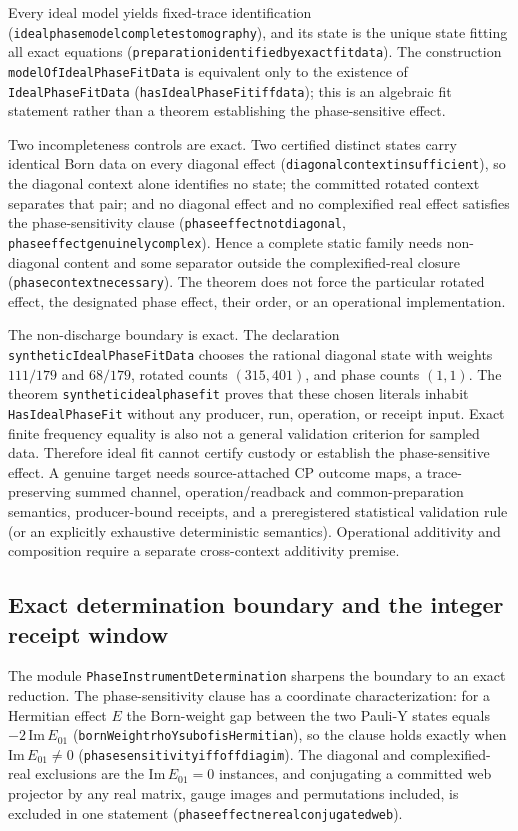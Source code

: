 \documentclass[11pt]{article}
\renewcommand{\_}{\textunderscore\allowbreak}
\theoremstyle{remark}
\begin{document}
Every ideal model yields fixed-trace identification
(\texttt{ideal\_phase\_model\_completes\_tomography}), and its state is the
unique state fitting all exact equations
(\texttt{preparation\_identified\_by\_exact\_fit\_data}). The construction
\texttt{modelOfIdealPhaseFitData} is equivalent only to the existence of
\texttt{IdealPhaseFitData} (\texttt{hasIdealPhaseFit\_iff\_data}); this is an
algebraic fit statement rather than a theorem establishing the
phase-sensitive effect.

Two incompleteness controls are exact. Two certified distinct states carry identical Born
data on every diagonal effect (\texttt{diagonal\_context\_insufficient}),
so the diagonal context alone identifies no state; the committed rotated
context separates that pair; and no diagonal effect and no complexified
real effect satisfies the phase-sensitivity clause
(\texttt{phase\_effect\_not\_diagonal},
\texttt{phase\_effect\_genuinely\_complex}). Hence a complete static family
needs non-diagonal content and some separator outside the complexified-real
closure (\texttt{phase\_context\_necessary}). The theorem does not force the
particular rotated effect, the designated phase effect, their order, or an
operational implementation.

The non-discharge boundary is exact. The declaration
\texttt{syntheticIdealPhaseFitData} chooses the rational diagonal state with
weights $111/179$ and $68/179$, rotated counts $(315,401)$, and phase counts
$(1,1)$. The theorem \texttt{synthetic\_ideal\_phase\_fit} proves that these
chosen literals inhabit \texttt{HasIdealPhaseFit} without any producer, run,
operation, or receipt input. Exact finite frequency equality is also not a
general validation criterion for sampled data. Therefore ideal fit cannot
certify custody or establish the phase-sensitive effect. A genuine target needs
source-attached CP outcome maps, a trace-preserving summed channel,
operation/readback and common-preparation semantics, producer-bound receipts,
and a preregistered statistical validation rule (or an explicitly exhaustive
deterministic semantics). Operational additivity and composition require a
separate cross-context additivity premise.

\subsection{Exact determination boundary and the integer receipt window}
\label{sec:phase-determination}

The module \texttt{PhaseInstrumentDetermination} sharpens the boundary to
an exact reduction. The phase-sensitivity clause has a coordinate
characterization: for a Hermitian effect $E$ the Born-weight gap between the
two Pauli-Y states equals $-2\,\mathrm{Im}\,E_{01}$
(\texttt{bornWeight\_rhoY\_sub\_of\_isHermitian}), so the clause holds exactly
when $\mathrm{Im}\,E_{01} \neq 0$
(\texttt{phase\_sensitivity\_iff\_offdiag\_im}). The diagonal and
complexified-real exclusions are the $\mathrm{Im}\,E_{01} = 0$ instances, and
conjugating a committed web projector by any real matrix, gauge images and
permutations included, is excluded in one statement
(\texttt{phase\_effect\_ne\_real\_conjugated\_web}).
\end{document}
